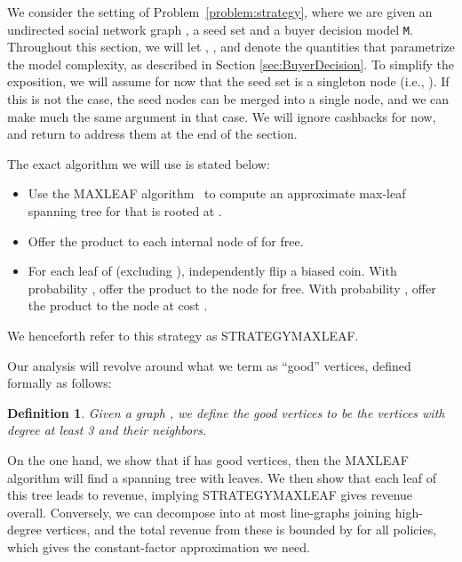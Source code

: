 \documentclass[letterpaper,twoside]{article}
\newtheorem{defn}{Definition}
\newcommand{\M}{\texttt{M}}
\newcommand{\maxleaf}{\textrm{M{\scriptsize AX}\-L{\scriptsize EAF}}}
\newcommand{\strategyml}{\textrm{S{\scriptsize TRATEGY}\-M{\scriptsize AX}\-L{\scriptsize EAF}}}
\begin{document}
We consider the setting of Problem~\ref{problem:strategy}, where we
are given an undirected social network graph , a seed set
 and a buyer decision model \M.  Throughout this
section, we will let , ,  and  denote the quantities
that parametrize the model complexity, as described in Section
\ref{sec:BuyerDecision}. To simplify the exposition, we will assume
for now that the seed set is a singleton node  (i.e., ). If
this is not the case, the seed nodes can be merged into a single node,
and we can make much the same argument in that case. We will ignore
cashbacks for now, and return to address them at the end of the section.

The exact algorithm we will use is stated below:
\begin{itemize}
    \item Use the \maxleaf{} algorithm~\cite{LR98} to compute an
    approximate max-leaf spanning tree  for  that is rooted at
    .
    \item Offer the product to each internal node of  for free.
    \item For each leaf of  (excluding ), independently flip a biased coin.
    With probability , offer the product to the node
    for free. With probability , offer the product to
    the node at cost .
\end{itemize}
We henceforth refer to this strategy as \strategyml.

Our analysis will revolve around what we term as ``good'' vertices, defined
formally as follows:
\begin{defn}
  Given a graph , we define the {\em good} vertices to be
  the vertices with degree at least 3 and their neighbors.
\end{defn}
On the one hand, we show that if  has  good vertices, then the
\maxleaf{} algorithm will find a spanning tree with 
leaves. We then show that each leaf of this tree leads to
 revenue, implying \strategyml{} gives  revenue
overall. Conversely, we can decompose  into at most 
line-graphs joining high-degree vertices, and the total revenue from
these is bounded by  for all policies, which gives the
constant-factor approximation we need.
\end{document}
